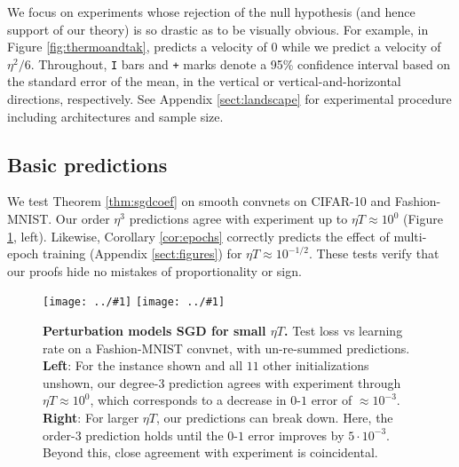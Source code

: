 \documentclass{article}
\theoremstyle{plain}
\theoremstyle{definition}
\newcommand{\plotmooh}[3]{\texttt{[image: ../\#1]}}
\begin{document}
    We focus on experiments whose rejection of the null hypothesis (and hence
    support of our theory) is so drastic as to be visually obvious.  For
    example, in Figure \ref{fig:thermoandtak}, \citep{ch18} predicts a velocity
    of $0$ while we predict a velocity of $\eta^2/6$.  
    Throughout, \texttt{I} bars and \texttt{+} marks denote a 95\% confidence
    interval based on the standard error of the mean, in the vertical or
    vertical-and-horizontal directions, respectively.  See Appendix
    \ref{sect:landscape} for experimental procedure including architectures and
    sample size.


    \subsection{Basic predictions}
        We test Theorem \ref{thm:sgdcoef} on smooth convnets on CIFAR-10 and
        Fashion-MNIST.  Our order $\eta^3$ predictions agree with experiment up
        to $\eta T \approx 10^0$ (Figure \ref{fig:vanilla}, left).
        Likewise, Corollary \ref{cor:epochs} correctly predicts the effect of
        multi-epoch training (Appendix \ref{sect:figures}) for $\eta T \approx
        10^{-1/2}$.  These tests verify that our proofs hide no mistakes of
        proportionality or sign.  

        \begin{figure}[h!] 
            \centering
            \plotmooh{plots/new-test-0}{}{3.0cm} 
            \plotmooh{plots/rebut-test-1-T100}{}{3.0cm} 
            \caption{
                {\bf Perturbation models SGD for small $\eta T$.}
                Test loss vs learning rate on a Fashion-MNIST convnet, with
                un-re-summed predictions.
                {\bf Left}: For the instance shown and all $11$ other
                initializations unshown, our degree-$3$ prediction
                agrees with experiment through $\eta T \approx 10^0$, which
                corresponds to a decrease in $0\mbox{-}1$ error of $\approx
                10^{-3}$.
                {\bf Right}: For larger $\eta T$, our predictions can break
                down.  Here, the order-$3$ prediction holds until the $0\mbox{-}1$
                error improves by $5\cdot 10^{-3}$.  Beyond this, close
                agreement with experiment is coincidental.
            }
            \label{fig:vanilla}
        \end{figure}
\end{document}
